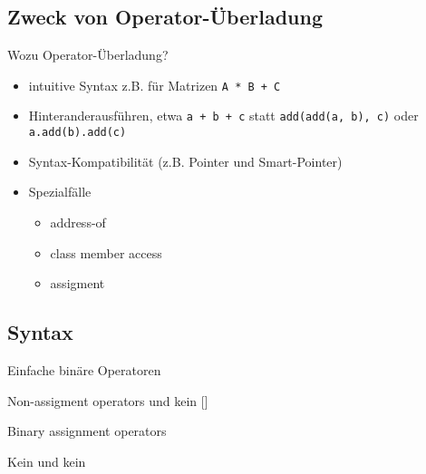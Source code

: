 \subsection{Zweck von Operator-Überladung}

\begin{frame}[fragile]{Wozu Operator-Überladung?}
	\begin{itemize}
		\item intuitive Syntax z.B. für Matrizen \verb|A * B + C|
		\pause
		\item Hinteranderausführen, etwa \verb|a + b + c| statt \verb|add(add(a, b), c)| oder \verb|a.add(b).add(c)|
		\pause
		\item Syntax-Kompatibilität (z.B. Pointer und Smart-Pointer)
		\pause
		\item Spezialfälle
		\begin{itemize}
			\item address-of \cppop{\&}
			\item class member access \cppop{-\textgreater} 
			\item assigment \cppop{=}
		\end{itemize}
	\end{itemize}
\end{frame}




\subsection{Syntax}

\begin{frame}[fragile, b]{Einfache binäre Operatoren}
	\onslide*<+>
	{
		\begin{block}{}
			
		\end{block}
	}
	
	\onslide*<+>
	{
		Non-assigment operators und kein []
		
		\begin{block}{}
			
		\end{block}
	}
	
	\vspace{3em}
\end{frame}


\begin{frame}[fragile, b]{Binary assignment operators}
	\onslide*<+>
	{
		\begin{block}{}
			
		\end{block}
	}
	
	\onslide*<+>
	{
		Kein \cppop{[]} und kein \cppop{()}
		
		\begin{block}{}
			
		\end{block}
	}
	
	\vspace{1em}
\end{frame}



